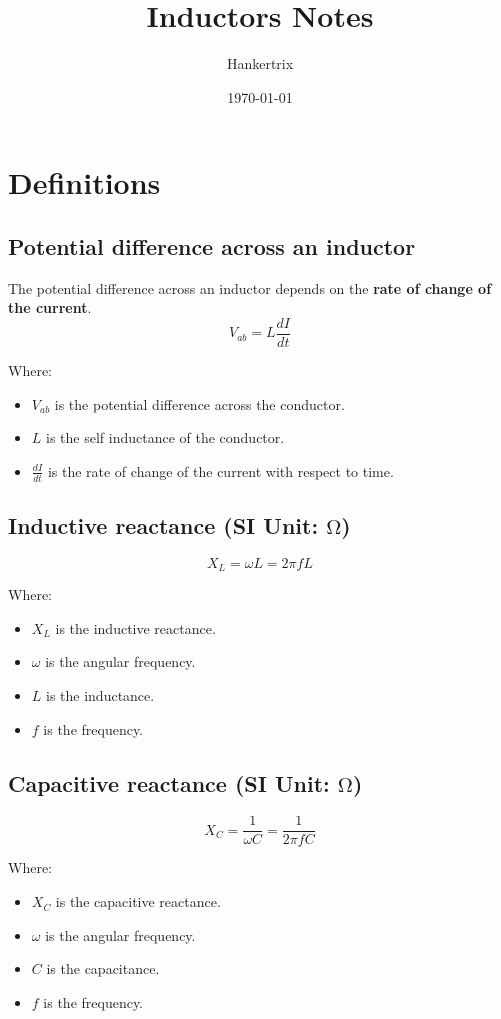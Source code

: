 \documentclass[11pt]{article}
\author{Hankertrix}
\date{\today}
\title{Inductors Notes}
\begin{document}
\maketitle
\setcounter{tocdepth}{2}
\tableofcontents \clearpage\section{Definitions}
\label{sec:org155e4d1}

\subsection{Potential difference across an inductor}
\label{sec:orgea9147f}
The potential difference across an inductor depends on the \textbf{rate of change of the current}.
\[V_{ab} = L \frac{dI}{dt}\]

Where:
\begin{itemize}
\item \(V_{ab}\) is the potential difference across the conductor.
\item \(L\) is the self inductance of the conductor.
\item \(\frac{dI}{dt}\) is the rate of change of the current with respect to time.
\end{itemize}
\subsection{Inductive reactance (SI Unit: \(\unit{\ohm}\))}
\label{sec:org2c483ae}
\[X_L = \omega L = 2 \pi f L\]

Where:
\begin{itemize}
\item \(X_L\) is the inductive reactance.
\item \(\omega\) is the angular frequency.
\item \(L\) is the inductance.
\item \(f\) is the frequency.
\end{itemize}
\subsection{Capacitive reactance (SI Unit: \(\unit{\ohm}\))}
\label{sec:org6624afa}
\[X_C = \frac{1}{\omega C} = \frac{1}{2 \pi f C}\]

Where:
\begin{itemize}
\item \(X_C\) is the capacitive reactance.
\item \(\omega\) is the angular frequency.
\item \(C\) is the capacitance.
\item \(f\) is the frequency.
\end{itemize}
\end{document}
